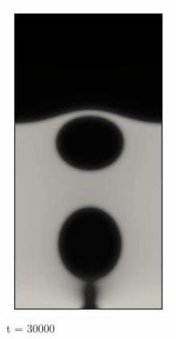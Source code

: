 \begin{figure}[h!]
\begin{subfigure}{0.25\textwidth}
		\includegraphics[width=\linewidth]{figs/cap4/bubble_30}
		\caption{t = 30000}
		\label{fig:5}
	\end{subfigure}\hfil %
	\begin{subfigure}{0.25\textwidth}

\end{subfigure}
\end{figure}
